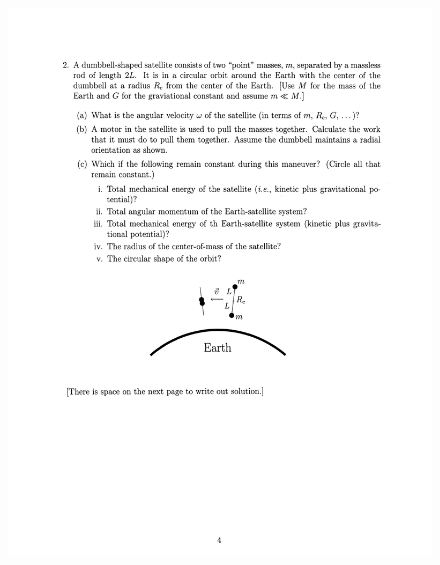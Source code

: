 \documentclass[10pt,a4paper]{article}
\begin{document}
\begin{figure}[H]
 \centering
 \includegraphics[width=16cm]{pdf/1-1T40.png}
\end{figure}
 \newpage
\end{document}
